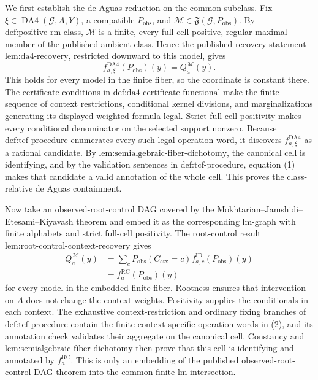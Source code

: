 We first establish the de Aguas reduction on the common subclass. Fix \(\xi\in\operatorname{DA4}(\mathcal G,A,Y)\), a compatible \(P_{\mathrm{obs}}\), and \(\mathcal M\in\mathfrak F(\mathcal G,P_{\mathrm{obs}})\). By \(\text{def:positive-rm-class}\), \(\mathcal M\) is a finite, every-full-cell-positive, regular-maximal member of the published ambient class. Hence the published recovery statement \(\text{lem:da4-recovery}\), restricted downward to this model, gives
\[
f^{\mathrm{DA4}}_{a,\xi}(P_{\mathrm{obs}})(y)
=Q_a^{\mathcal M}(y).
\tag{1}
\]
This holds for every model in the finite fiber, so the coordinate is constant there. The certificate conditions in \(\text{def:da4-certificate-functional}\) make the finite sequence of context restrictions, conditional kernel divisions, and marginalizations generating its displayed weighted formula legal. Strict full-cell positivity makes every conditional denominator on the selected support nonzero. Because \(\text{def:tcf-procedure}\) enumerates every such legal operation word, it discovers \(f^{\mathrm{DA4}}_{a,\xi}\) as a rational candidate. By \(\text{lem:semialgebraic-fiber-dichotomy}\), the canonical cell is identifying, and by the validation sentences in \(\text{def:tcf-procedure}\), equation (1) makes that candidate a valid annotation of the whole cell. This proves the class-relative de Aguas containment.

Now take an observed-root-control DAG covered by the Mokhtarian--Jamshidi--Etesami--Kiyavash theorem and embed it as the corresponding lm-graph with finite alphabets and strict full-cell positivity. The root-control result \(\text{lem:root-control-context-recovery}\) gives
\[
\begin{aligned}
Q_a^{\mathcal M}(y)
&=\sum_cP_{\mathrm{obs}}(C_{\mathrm{ctx}}=c)
f_{a,c}^{\mathrm{ID}}(P_{\mathrm{obs}})(y)\\
&=f_a^{\mathrm{RC}}(P_{\mathrm{obs}})(y)
\end{aligned}
\tag{2}
\]
for every model in the embedded finite fiber. Rootness ensures that intervention on \(A\) does not change the context weights. Positivity supplies the conditionals in each context. The exhaustive context-restriction and ordinary fixing branches of \(\text{def:tcf-procedure}\) contain the finite context-specific operation words in (2), and its annotation check validates their aggregate on the canonical cell. Constancy and \(\text{lem:semialgebraic-fiber-dichotomy}\) then prove that this cell is identifying and annotated by \(f_a^{\mathrm{RC}}\). This is only an embedding of the published observed-root-control DAG theorem into the common finite lm intersection.

